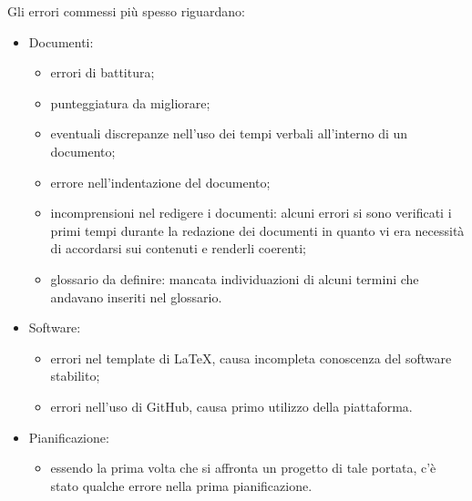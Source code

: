 \documentclass[../piano_di_qualifica.tex]{subfiles}
\begin{document}
Gli errori commessi più spesso riguardano:
\begin{itemize}
    \item Documenti:
    \begin{itemize}
        \item errori di battitura; 
        \item punteggiatura da migliorare;
        \item eventuali discrepanze nell'uso dei tempi verbali all'interno di un documento;
        \item errore nell'indentazione del documento;
        \item incomprensioni nel redigere i documenti: alcuni errori si sono verificati i primi tempi durante la redazione dei documenti in quanto 
                vi era necessità di accordarsi sui contenuti e renderli coerenti;
        \item glossario da definire: mancata individuazioni di alcuni termini che andavano inseriti nel glossario.
    \end{itemize}
    \item Software:
    \begin{itemize}
        \item errori nel template di \LaTeX, causa incompleta conoscenza del software stabilito;
        \item errori nell'uso di GitHub, causa primo utilizzo della piattaforma.
    \end{itemize}
    \item Pianificazione:
    \begin{itemize}
        \item essendo la prima volta che si affronta un progetto di tale portata, c'è stato qualche errore nella prima pianificazione.
    \end{itemize}
\end{itemize}
\end{document}
